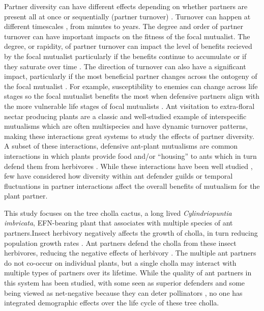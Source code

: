 \documentclass[11pt]{article}\usepackage[sc]{mathpazo} %
\begin{document}
  Partner diversity can have different effects depending on whether partners are present all at once or sequentially (partner turnover) \cite{Djieto-Lordon2005, Ness2006, Bruna2014}. 
Turnover can happen at different timescales \cite{Oliveira1999,Horvitz1986}, from minutes to years. 
The degree and order of partner turnover can have important impacts on the fitness of the focal mutualist.
The degree, or rapidity, of partner turnover can impact the level of benefits recieved by the focal mutualist particularly if the benefits continue to accumulate or if they saturate over time \cite{Sachs2004}.
The direction of turnover can also have a significant impact, particularly if the most beneficial partner changes across the ontogeny of the focal mutualist \cite{Fonseca2003}.
For example, susceptibility to enemies can change across life stages \cite{Boege2005,Barton2010} so the focal mutualist benefits the most when defensive partners align with the more vulnerable life stages of focal mutualists \cite{Djieto-Lordon2005}.
Ant visitation to extra-floral nectar producing plants are a classic and well-studied example of interspecific mutualisms which are often multispecies and have dynamic turnover patterns, making these interactions great systems to study the effects of partner diversity.
A subset of these interactions, defensive ant-plant mutualisms are common interactions in which plants provide food and/or ``housing'' to ants which in turn defend them from herbivores \cite{Bronstein1998, Bronstein2006}. 
While these interactions have been well studied \cite{Ness2006,Beattie1985,Schultheiss2022}, few have considered how diversity within ant defender guilds \cite{Stanton2013} or temporal fluctuations in partner interactions \cite{Trøjelsgaard2015} affect the overall benefits of mutualism for the plant partner.

  This study focuses on the tree cholla cactus, a long lived \textit{Cylindriopuntia imbricata}, EFN-bearing plant that associates with multiple species of ant partners.Insect herbivory negatively affects the growth of cholla, in turn reducing population growth rates \cite{Miller2009}. 
Ant partners defend the cholla from these insect herbivores, reducing the negative effects of herbivory \cite{Miller2007}. 
The multiple ant partners do not co-occur on individual plants, but a single cholla may interact with multiple types of partners over its lifetime.
While the quality of ant partners in this system has been studied, with some seen as superior defenders and some  being viewed as net-negative because they can deter pollinators \cite{Ohm2014}, no one has integrated demographic effects over the life cycle of these tree cholla.
  
\end{document}

